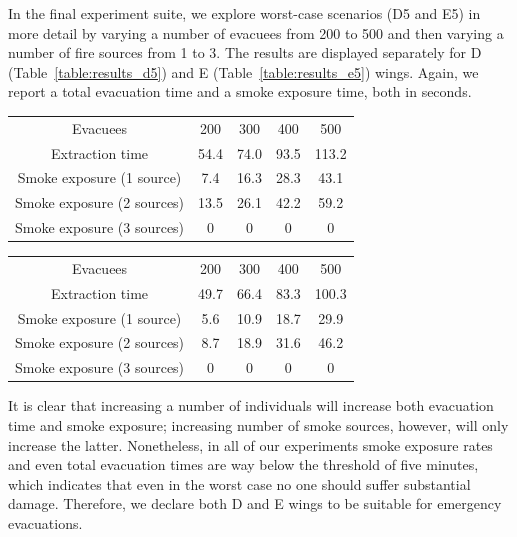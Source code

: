 In the final experiment suite, we explore worst-case scenarios (D5 and E5) in
more detail by varying a number of evacuees from 200 to 500 and then varying
a number of fire sources from 1 to 3.
The results are displayed separately for D (Table~\ref{table:results_d5})
and E (Table~\ref{table:results_e5}) wings.
Again, we report a total evacuation time and a smoke exposure time,
both in seconds.

\begin{center}
    \label{table:results_d5}
    \begin{tabular}{ c | c | c | c | c }
        \hline
        Evacuees & 200 & 300 & 400 & 500 \\
        Extraction time & 54.4 & 74.0 & 93.5 & 113.2 \\
        Smoke exposure (1 source) & 7.4 & 16.3 & 28.3 & 43.1 \\
        Smoke exposure (2 sources) & 13.5 & 26.1 & 42.2 & 59.2 \\
        Smoke exposure (3 sources) & 0 & 0 & 0 & 0 \\
        \hline
    \end{tabular}
\end{center}

\begin{center}
    \label{table:results_e5}
    \begin{tabular}{ c | c | c | c | c }
        \hline
        Evacuees & 200 & 300 & 400 & 500 \\
        Extraction time & 49.7 & 66.4 & 83.3 & 100.3 \\
        Smoke exposure (1 source) & 5.6 & 10.9 & 18.7 & 29.9 \\
        Smoke exposure (2 sources) & 8.7 & 18.9 & 31.6 & 46.2 \\
        Smoke exposure (3 sources) & 0 & 0 & 0 & 0 \\
        \hline
    \end{tabular}
\end{center}

It is clear that increasing a number of individuals will increase both
evacuation time and smoke exposure; increasing number of smoke sources, however,
will only increase the latter.
Nonetheless, in all of our experiments smoke exposure rates and even total
evacuation times are way below the threshold of five minutes, which indicates
that even in the worst case no one should suffer substantial damage.
Therefore, we declare both D and E wings to be suitable for emergency
evacuations.

